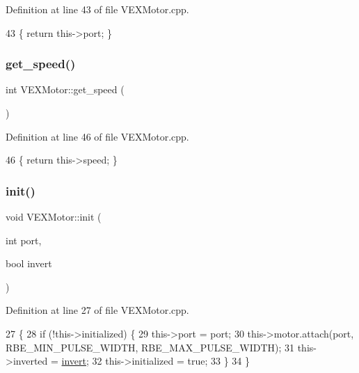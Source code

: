 Definition at line 43 of file V\+E\+X\+Motor.\+cpp.


\begin{DoxyCode}
43 \{ \textcolor{keywordflow}{return} this->port; \}
\end{DoxyCode}
\mbox{\label{class_v_e_x_motor_af2e32fe5adc71a85977a728ba3531a96}} 
\subsubsection{\texorpdfstring{get\+\_\+speed()}{get\_speed()}}
{\footnotesize\ttfamily int V\+E\+X\+Motor\+::get\+\_\+speed (\begin{DoxyParamCaption}{ }\end{DoxyParamCaption})}



Definition at line 46 of file V\+E\+X\+Motor.\+cpp.


\begin{DoxyCode}
46 \{ \textcolor{keywordflow}{return} this->speed; \}
\end{DoxyCode}
\mbox{\label{class_v_e_x_motor_a67dc328fafe4cd889b40a1147a0d4326}} 
\subsubsection{\texorpdfstring{init()}{init()}}
{\footnotesize\ttfamily void V\+E\+X\+Motor\+::init (\begin{DoxyParamCaption}\item[{int}]{port,  }\item[{bool}]{invert }\end{DoxyParamCaption})}



Definition at line 27 of file V\+E\+X\+Motor.\+cpp.


\begin{DoxyCode}
27                                          \{
28     \textcolor{keywordflow}{if} (!this->initialized) \{
29         this->port = port;
30         this->motor.attach(port, RBE\_MIN\_PULSE\_WIDTH, RBE\_MAX\_PULSE\_WIDTH);
31         this->inverted = \hyperlink{class_v_e_x_motor_a2c4c51b0b9c1c6747e0a8f1cee9f39e3}{invert};
32         this->initialized = \textcolor{keyword}{true};
33     \}
34 \}
\end{DoxyCode}
\mbox{\label{class_v_e_x_motor_a2c4c51b0b9c1c6747e0a8f1cee9f39e3}} 
